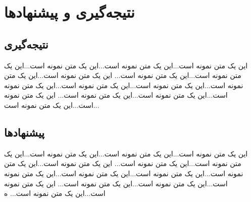 \chapter{نتیجه‌گیری و پیشنهادها}

\section{نتیجه‌گیری}
این یک متن نمونه است...این یک متن نمونه است...این یک متن نمونه است...این یک متن نمونه است...این یک متن نمونه است... این یک متن نمونه است...این یک متن نمونه است...این یک متن نمونه است...این یک متن نمونه است...این یک متن نمونه است...این یک متن نمونه است...این یک متن نمونه است... این یک متن نمونه است...این یک متن نمونه است...

\section{پیشنهادها}
این یک متن نمونه است...این یک متن نمونه است...این یک متن نمونه است...این یک متن نمونه است...این یک متن نمونه است... این یک متن نمونه است...این یک متن نمونه است...این یک متن نمونه است...این یک متن نمونه است...این یک متن نمونه است...این یک متن نمونه است...این یک متن نمونه است... این یک متن نمونه است...این یک متن نمونه است...
ه


